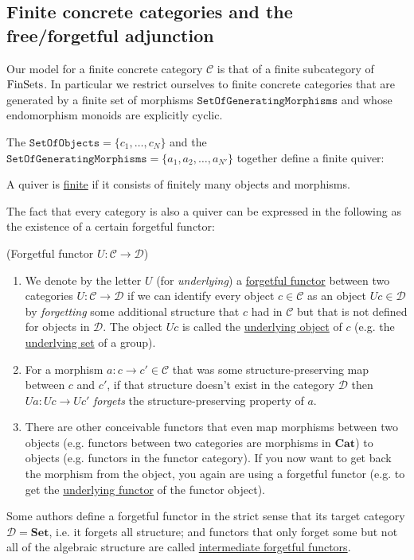 

\subsection{Finite concrete categories and the free/forgetful adjunction}\label{sec:fin_concrete_cat_free_forgetful}

Our model for a finite concrete category $\mathcal{C}$ is that of a finite subcategory of $\mathrm{FinSets}$. In particular we restrict ourselves
to finite concrete categories that are generated by a finite set of morphisms $\mathtt{SetOfGeneratingMorphisms}$ and whose endomorphism
monoids are explicitly cyclic.

The $\mathtt{SetOfObjects} = \{ c_{1},\dots,c_{N} \} $ and the $\mathtt{SetOfGeneratingMorphisms} = \{ a_{1},a_{2},\dots,a_{N'} \}$
together define a finite quiver:

\begin{definition}\label{def:quiver_generated}
A quiver is \ul{finite} if it consists of finitely many objects and morphisms.
\end{definition}

The fact that every category is also a quiver can be expressed in the following as the existence of a certain forgetful functor:

\begin{example}{(Forgetful functor $U : \mathcal{C} \rightarrow \mathcal{D}$)}
\begin{enumerate}
\renewcommand{\labelenumi}{(\theenumi)}
\item We denote by the letter $U$ (for \textit{underlying}) a \ul{forgetful functor} between two categories $U : \mathcal{C} \rightarrow \mathcal{D}$ if
we can identify every object $c \in \mathcal{C}$ as an object $Uc \in \mathcal{D}$ by \textit{forgetting} some additional structure that $c$ had
in $\mathcal{C}$ but that is not defined for objects in $\mathcal{D}$. The object $Uc$ is called the \ul{underlying object} of $c$ (e.g. the
\ul{underlying set} of a group).
\item For a morphism $a : c \rightarrow c' \in \mathcal{C}$ that was some structure-preserving map between $c$ and $c'$, if that structure doesn't
exist in the category $\mathcal{D}$ then $Ua : Uc \rightarrow Uc'$ \textit{forgets} the structure-preserving property of $a$.
\item There are other conceivable functors that even map morphisms between two objects
(e.g. functors between two categories are morphisms in $\mathrm{\textbf{Cat}}$) to objects (e.g. functors in the functor category). If you now
want to get back the morphism from the object, you again are using a forgetful functor (e.g. to get the \ul{underlying functor} of the functor object).
\end{enumerate}
Some authors define a forgetful functor in the strict sense that its target category $\mathcal{D} = \mathrm{\textbf{Set}}$, i.e. it forgets all structure;
and functors that only forget some but not all of the algebraic structure are called \ul{intermediate forgetful functors}.
\end{example}

